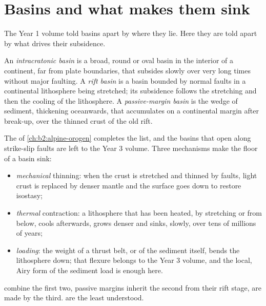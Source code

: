\section{Basins and what makes them sink}\label{sec:b2:basins-compared:types}

The Year 1 volume told basins apart by where they lie. Here they are told apart by what drives
their subsidence.

\begin{definition}\label{def:b2:basins-compared:types}
An \emph{intracratonic basin} is a broad, round or oval basin in the
interior of a continent, far from plate boundaries, that subsides slowly over very long times
without major faulting. A \emph{rift basin} is a basin bounded by normal faults
in a continental lithosphere being stretched; its subsidence follows the stretching and then
the cooling of the lithosphere. A \emph{passive-margin basin} is the
wedge of sediment, thickening oceanwards, that accumulates on a continental margin after
break-up, over the thinned crust of the old rift.
\end{definition}

The  of \cref{ch:b2:alpine-orogen} completes the list, and the basins that open
along strike-slip faults are left to the Year 3 volume. Three mechanisms make the floor of a
basin sink:
\begin{itemize}
  \item \emph{mechanical} thinning: when the crust is stretched and thinned by faults, light
        crust is replaced by denser mantle and the surface goes down to restore isostasy;
  \item \emph{thermal} contraction: a lithosphere that has been heated, by stretching or from
        below, cools afterwards, grows denser and sinks, slowly, over tens of millions of years;
  \item \emph{loading}: the weight of a thrust belt, or of the sediment itself, bends the
        lithosphere down; that flexure belongs to the Year 3 volume, and the local, Airy form of
        the sediment load is enough here.
\end{itemize}
 combine the first two, passive margins inherit the second from their rift stage,
 are made by the third.  are the least understood.

